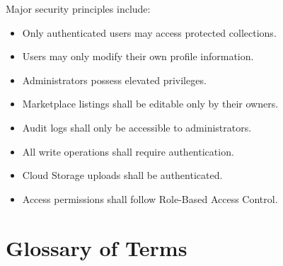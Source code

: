 Major security principles include:

\begin{itemize}

\item Only authenticated users may access protected collections.

\item Users may only modify their own profile information.

\item Administrators possess elevated privileges.

\item Marketplace listings shall be editable only by their owners.

\item Audit logs shall only be accessible to administrators.

\item All write operations shall require authentication.

\item Cloud Storage uploads shall be authenticated.

\item Access permissions shall follow Role-Based Access Control.

\end{itemize}

\section{Glossary of Terms}

